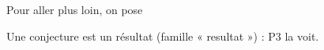Pour aller plus loin, on pose
\begin{conjecture} %
  Une conjecture est un résultat (famille « resultat ») : P3 la voit.
\end{conjecture}
